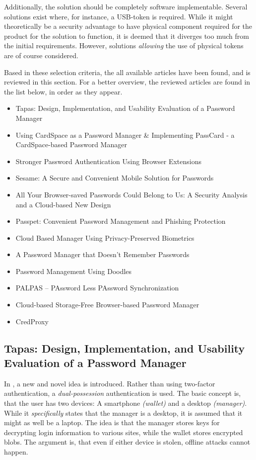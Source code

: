 		Additionally, the solution should be completely software implementable. Several solutions exist where, for instance, a USB-token is required. While it might theoretically be a security advantage to have physical component required for the product for the solution to function, it is deemed that it diverges too much from the initial requirements. However, solutions \emph{allowing} the use of physical tokens are of course considered.

		
		Based in these selection criteria, the all available articles have been found, and is reviewed in this section. For a better overview, the reviewed articles are found in the list below, in order as they appear.

		\begin{itemize}
			\item Tapas: Design, Implementation, and Usability Evaluation of a Password Manager \cite{tapas}
			\item Using CardSpace as a Password Manager \& Implementing PassCard - a CardSpace-based Password Manager \cite{cardspace,cardspace_impl}
			\item Stronger Password Authentication Using Browser Extensions
			\item Sesame: A Secure and Convenient Mobile Solution for Passwords
			\item All Your Browser-saved Passwords Could Belong to Us: A Security Analysis and a Cloud-based New Design
			\item Passpet: Convenient Password Management and Phishing Protection
			\item Cloud Based Manager Using Privacy-Preserved Biometrics
			\item A Password Manager that Doesn't Remember Passwords
			\item Password Management Using Doodles
			\item PALPAS -- PAssword Less PAssword Synchronization
			\item Cloud-based Storage-Free Browser-based Password Manager
			\item CredProxy
		\end{itemize}

		\subsection*{Tapas: Design, Implementation, and Usability Evaluation of a Password Manager}
			In \cite{tapas}, a new and novel idea is introduced. Rather than using two-factor authentication, a \emph{dual-possession} authentication is used. The basic concept is, that the user has two devices: A smartphone \emph{(wallet)} and a desktop \emph{(manager)}. While it \emph{specifically} states that the manager is a desktop, it is assumed that it might as well be a laptop. The idea is that the manager stores keys for decrypting login information to various sites, while the wallet stores encrypted blobs. The argument is, that even if either device is stolen, offline attacks cannot happen.

